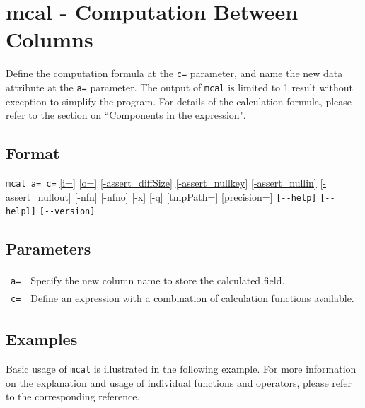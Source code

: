 
%

\section{mcal - Computation Between Columns\label{sect:mcal}}

Define the computation formula at the \verb|c=| parameter, and name the new data attribute at the \verb|a=| parameter. The output of \verb|mcal| is limited to 1 result without exception to simplify the program. For details of the calculation formula, please refer to the section on “Components in the expression".


\subsection*{Format}
\verb|mcal a= c=|
\hyperref[sect:option_i]{[i=]}
\hyperref[sect:option_o]{[o=]}
\hyperref[sect:option_assert_diffSize]{[-assert\_diffSize]}
\hyperref[sect:option_assert_nullkey]{[-assert\_nullkey]}
\hyperref[sect:option_assert_nullin]{[-assert\_nullin]}
\hyperref[sect:option_assert_nullout]{[-assert\_nullout]}
\hyperref[sect:option_nfn]{[-nfn]} 
\hyperref[sect:option_nfno]{[-nfno]}  
\hyperref[sect:option_x]{[-x]}
\hyperref[sect:option_q]{[-q]}
\hyperref[sect:option_option_tmppath]{[tmpPath=]}
\hyperref[sect:option_precision]{[precision=]}
\verb|[--help]|
\verb|[--helpl]|
\verb|[--version]|\\

\subsection*{Parameters}
\begin{table}[hb]
{\small
\begin{tabular}{ll}
	\verb|a=|    & Specify the new column name to store the calculated field.\\
	\verb|c=|    & Define an expression with a combination of calculation functions available. \\
\end{tabular} 
}
\end{table} 

\subsection*{Examples}
Basic usage of \verb|mcal| is illustrated in the following example. For more information on the explanation and usage of individual functions and operators, please refer to the corresponding reference. 


